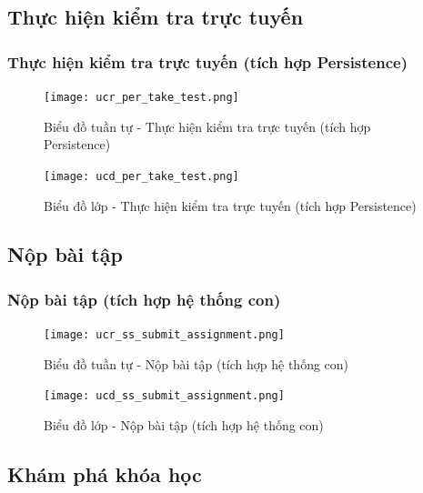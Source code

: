 \documentclass[./../main.tex]{subfiles}
\begin{document}
\subsection{Thực hiện kiểm tra trực tuyến}
\subsubsection{Thực hiện kiểm tra trực tuyến (tích hợp Persistence)}
\begin{figure}[H]
    \centering
    \texttt{[image: ucr\_per\_take\_test.png]}
    \caption{Biểu đồ tuần tự - Thực hiện kiểm tra trực tuyến (tích hợp Persistence)}
\end{figure}
\begin{figure}[H]
    \centering
    \texttt{[image: ucd\_per\_take\_test.png]}
    \caption{Biểu đồ lớp - Thực hiện kiểm tra trực tuyến (tích hợp Persistence)}
\end{figure}

\subsection{Nộp bài tập}
\subsubsection{Nộp bài tập (tích hợp hệ thống con)}
\begin{figure}[H]
    \centering
    \texttt{[image: ucr\_ss\_submit\_assignment.png]}
    \caption{Biểu đồ tuần tự - Nộp bài tập (tích hợp hệ thống con)}
\end{figure}
\begin{figure}[H]
    \centering
    \texttt{[image: ucd\_ss\_submit\_assignment.png]}
    \caption{Biểu đồ lớp - Nộp bài tập (tích hợp hệ thống con)}
\end{figure}

\subsection{Khám phá khóa học}
\end{document}
